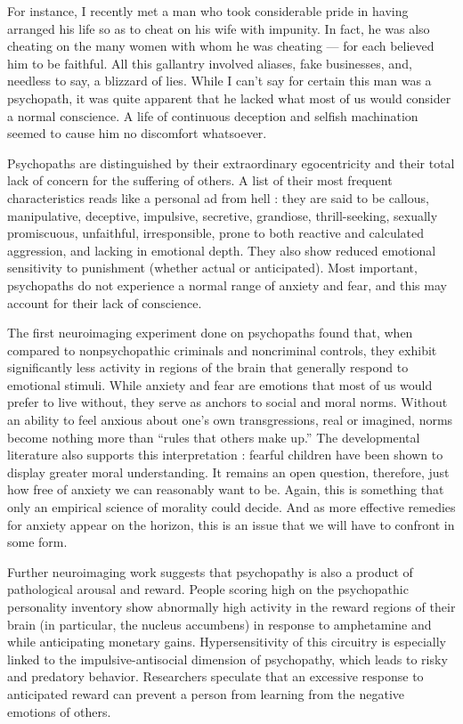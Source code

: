 \documentclass[a4paper,14pt]{extarticle}
\begin{document}
For instance, I recently met a man who took considerable pride in having arranged his life so as to cheat on his wife with impunity.
In fact, he was also cheating on the many women with whom he was cheating --- for each believed him to be faithful.
All this gallantry involved aliases, fake businesses, and, needless to say, a blizzard of lies.
While I can’t say for certain this man was a psychopath, it was quite apparent that he lacked what most of us would consider a normal conscience.
A life of continuous deception and selfish machination seemed to cause him no discomfort whatsoever.

Psychopaths are distinguished by their extraordinary egocentricity and their total lack of concern for the suffering of others.
A list of their most frequent characteristics reads like a personal ad from hell :
they are said to be callous, manipulative, deceptive, impulsive, secretive, grandiose, thrill-seeking, sexually promiscuous, unfaithful, irresponsible, prone to both reactive and calculated aggression, and lacking in emotional depth.
They also show reduced emotional sensitivity to punishment (whether actual or anticipated).
Most important, psychopaths do not experience a normal range of anxiety and fear, and this may account for their lack of conscience.

The first neuroimaging experiment done on psychopaths found that, when compared to nonpsychopathic criminals and noncriminal controls, they exhibit significantly less activity in regions of the brain that generally respond to emotional stimuli.
While anxiety and fear are emotions that most of us would prefer to live without, they serve as anchors to social and moral norms.
Without an ability to feel anxious about one’s own transgressions, real or imagined, norms become nothing more than ``rules that others make up.''
The developmental literature also supports this interpretation :
fearful children have been shown to display greater moral understanding.
It remains an open question, therefore, just how free of anxiety we can reasonably want to be.
Again, this is something that only an empirical science of morality could decide.
And as more effective remedies for anxiety appear on the horizon, this is an issue that we will have to confront in some form.

Further neuroimaging work suggests that psychopathy is also a product of pathological arousal and reward.
People scoring high on the psychopathic personality inventory show abnormally high activity in the reward regions of their brain (in particular, the nucleus accumbens) in response to amphetamine and while anticipating monetary gains.
Hypersensitivity of this circuitry is especially linked to the impulsive-antisocial dimension of psychopathy, which leads to risky and predatory behavior.
Researchers speculate that an excessive response to anticipated reward can prevent a person from learning from the negative emotions of others.
\end{document}
